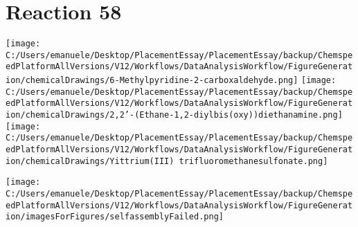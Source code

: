 \documentclass{article}%
\begin{document}
\section*{Reaction 58}%
%
\begin{scheme}[H]%
\begin{minipage}{0.5\textwidth}%
\texttt{[image: C:/Users/emanuele/Desktop/PlacementEssay/PlacementEssay/backup/ChemspeedPlatformAllVersions/V12/Workflows/DataAnalysisWorkflow/FigureGeneration/chemicalDrawings/6-Methylpyridine-2-carboxaldehyde.png]}%
\texttt{[image: C:/Users/emanuele/Desktop/PlacementEssay/PlacementEssay/backup/ChemspeedPlatformAllVersions/V12/Workflows/DataAnalysisWorkflow/FigureGeneration/chemicalDrawings/2,2'-(Ethane-1,2-diylbis(oxy))diethanamine.png]}%
\texttt{[image: C:/Users/emanuele/Desktop/PlacementEssay/PlacementEssay/backup/ChemspeedPlatformAllVersions/V12/Workflows/DataAnalysisWorkflow/FigureGeneration/chemicalDrawings/Yittrium(III) trifluoromethanesulfonate.png]}%
\end{minipage}%
\begin{minipage}{0.5\textwidth}%
\begin{center}%
\texttt{[image: C:/Users/emanuele/Desktop/PlacementEssay/PlacementEssay/backup/ChemspeedPlatformAllVersions/V12/Workflows/DataAnalysisWorkflow/FigureGeneration/imagesForFigures/selfassemblyFailed.png]}%
\end{center}%
\end{minipage}%
\caption{Self-assembly of components 8, 19, with Yittrium(III) in a 3.0:1.5:1.0 molar ratio in CH$_3$CN at 60\textdegree C for 40h. These are the reagents (starting materials) for reaction 58.}%
\end{scheme}%
\end{document}
